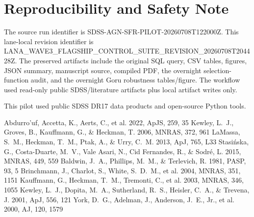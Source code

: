 \documentclass[twocolumn]{aastex631}
\begin{document}
\section*{Reproducibility and Safety Note}
The source run identifier is SDSS-AGN-SFR-PILOT-20260708T122000Z.  This lane-local revision identifier is LANA_WAVE3_FLAGSHIP_CONTROL_SUITE_REVISION_20260708T204428Z.  The preserved artifacts include the original SQL query, CSV tables, figures, JSON summary, manuscript source, compiled PDF, the overnight selection-function audit, and the overnight Goru robustness tables/figure.  The workflow used read-only public SDSS/literature artifacts plus local artifact writes only.

\acknowledgments
This pilot used public SDSS DR17 data products and open-source Python tools.

\begin{thebibliography}{}

 Abdurro'uf, Accetta, K., Aerts, C., et al. 2022, ApJS, 259, 35
 Kewley, L.~J., Groves, B., Kauffmann, G., \& Heckman, T. 2006, MNRAS, 372, 961
 LaMassa, S.~M., Heckman, T.~M., Ptak, A., \& Urry, C.~M. 2013, ApJ, 765, L33
 Stasi\'nska, G., Costa-Duarte, M.~V., Vale Asari, N., Cid Fernandes, R., \& Sodr\'e, L. 2015, MNRAS, 449, 559
 Baldwin, J.~A., Phillips, M.~M., \& Terlevich, R. 1981, PASP, 93, 5
 Brinchmann, J., Charlot, S., White, S.~D.~M., et al. 2004, MNRAS, 351, 1151
 Kauffmann, G., Heckman, T.~M., Tremonti, C., et al. 2003, MNRAS, 346, 1055
 Kewley, L.~J., Dopita, M.~A., Sutherland, R.~S., Heisler, C.~A., \& Trevena, J. 2001, ApJ, 556, 121
 York, D.~G., Adelman, J., Anderson, J.~E., Jr., et al. 2000, AJ, 120, 1579
\end{thebibliography}
\end{document}
